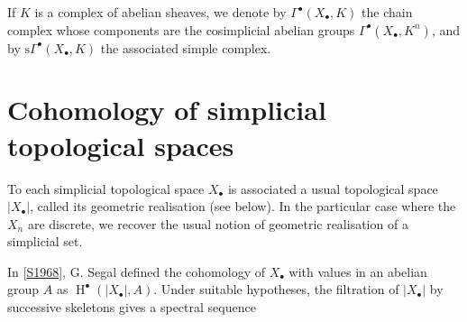     If \(K\) is a complex of abelian sheaves, we denote by \(\Gamma ^\bullet (X_\bullet ,K)\) the chain complex whose components are the cosimplicial abelian groups \(\Gamma ^\bullet (X_\bullet ,K^n)\), and by \(\mathrm {s} \Gamma ^\bullet (X_\bullet ,K)\) the associated simple complex.\section{Cohomology of simplicial topological spaces}\label{hodge-theory-iii-5.2}\label{hodge-theory-iii-5.2.1}\par{}To each simplicial topological space \(X_\bullet \) is associated a usual topological space \(|X_\bullet |\), called its geometric realisation (see below).
    In the particular case where the \(X_n\) are discrete, we recover the usual notion of geometric realisation of a simplicial set.\par{}In [\hyperref[S1968]{S1968}], G. Segal defined the cohomology of \(X_\bullet \) with values in an abelian group \(A\) as \(\operatorname {H}^\bullet (|X_\bullet |,A)\).
    Under suitable hypotheses, the filtration of \(|X_\bullet |\) by successive skeletons gives a spectral sequence


